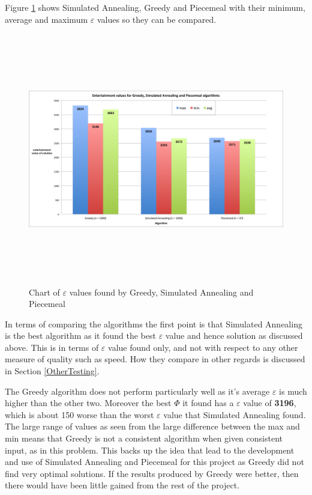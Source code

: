 \documentclass[12pt]{report}
\begin{document}
Figure \ref{eScreenshot} shows Simulated Annealing, Greedy and Piecemeal with their minimum, average and maximum $\varepsilon$ values so they can be compared.

\begin{figure}[H]
\centering
\includegraphics[width=18cm, height=11cm]{./entertainmentValues}
\caption{Chart of $\varepsilon$ values found by Greedy, Simulated Annealing and Piecemeal}
\label{eScreenshot}
\end{figure}

In terms of comparing the algorithms the first point is that Simulated Annealing is the best algorithm as it found the best $\varepsilon$ value and hence solution as discussed above. This is in terms of $\varepsilon$ value found only, and not with respect to any other measure of quality such as speed. How they compare in other regards is discussed in Section \ref{OtherTesting}.

The Greedy algorithm does not perform particularly well as it's average $\varepsilon$ is much higher than the other two. Moreover the best $\Phi$ it found has a $\varepsilon$ value of \textbf{3196}, which is about 150 worse than the worst $\varepsilon$ value that Simulated Annealing found. The large range of values as seen from the large difference between the max and min means that Greedy is not a consistent algorithm when given consistent input, as in this problem. This backs up the idea that lead to the development and use of Simulated Annealing and Piecemeal for this project as Greedy did not find very optimal solutions. If the results produced by Greedy were better, then there would have been little gained from the rest of the project. 
\end{document}
